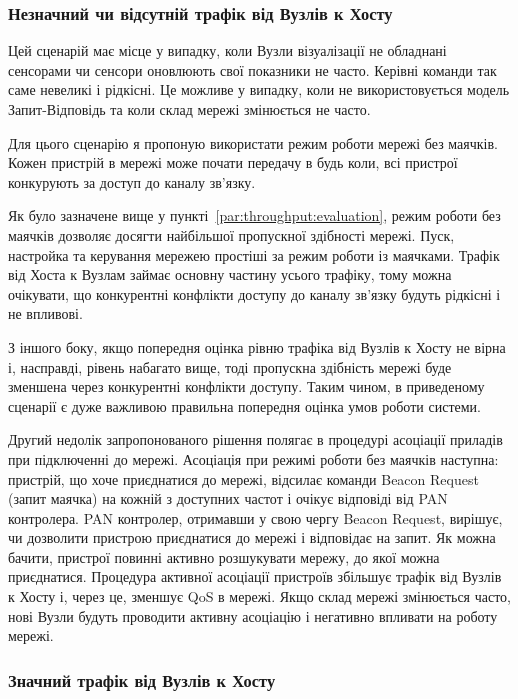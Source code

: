 \documentclass[a4paper,ukrainian,utf8,nocolumnsxix,floatsection,equationsection]{eskdtext}
\renewcommand\paragraph{\subsubsection}
\begin{document}
\paragraph{Незначний чи відсутній трафік від Вузлів к Хосту}
\label{par:low:ntht}

Цей сценарій має місце у випадку, коли Вузли візуалізації не обладнані сенсорами чи сенсори оновлюють свої показники не часто. Керівні команди так саме невеликі і рідкісні. Це можливе у випадку, коли не використовується модель Запит-Відповідь та коли склад мережі змінюється не часто.

Для цього сценарію я пропоную використати режим роботи мережі без маячків. Кожен пристрій в мережі може почати передачу в будь коли, всі пристрої конкурують за доступ до каналу зв’язку. 

Як було зазначене вище у пункті~\ref{par:throughput:evaluation}, режим роботи без маячків дозволяє досягти найбільшої пропускної здібності мережі. Пуск, настройка та керування мережею простіші за режим роботи із маячками. Трафік від Хоста к Вузлам займає основну частину усього трафіку, тому можна очікувати, що конкурентні конфлікти доступу до каналу зв’язку будуть рідкісні і не впливові.

З іншого боку, якщо попередня оцінка рівню трафіка від Вузлів к Хосту не вірна і, насправді, рівень набагато вище, тоді пропускна здібність мережі буде зменшена через конкурентні конфлікти доступу. Таким чином, в приведеному сценарії є дуже важливою правильна попередня оцінка умов роботи системи.

Другий недолік запропонованого рішення полягає в процедурі асоціації приладів при підключенні до мережі. Асоціація при режимі роботи без маячків наступна: пристрій, що хоче приєднатися до мережі, відсилає команди Beacon Request (запит маячка) на кожній з доступних частот і очікує відповіді від PAN контролера. PAN контролер, отримавши  у свою чергу Beacon Request, вирішує, чи дозволити пристрою приєднатися до мережі і відповідає на запит. Як можна бачити, пристрої повинні активно розшукувати мережу, до якої можна приєднатися. Процедура активної асоціації пристроїв збільшує трафік від Вузлів к Хосту і, через це, зменшує QoS в мережі. Якщо склад мережі змінюється часто, нові Вузли будуть проводити активну асоціацію і негативно впливати на роботу мережі.

\paragraph{Значний трафік від Вузлів к Хосту}
\label{par:high:ntht}
\end{document}
